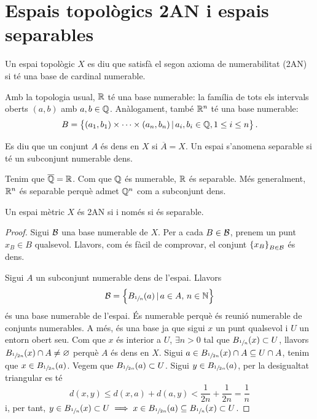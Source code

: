 \section{Espais topològics 2AN i espais separables}

\begin{defi}
	Un espai topològic $X$ es diu que satisfà el segon axioma de numerabilitat (2AN) si té una base de cardinal numerable.
\end{defi}

\begin{example}
	Amb la topologia usual, $\mathbb{R}$ t\'e una base numerable: la fam\'ilia de tots els intervals oberts $(a, b)$ amb $a, b \in \mathbb{Q}$. An\`alogament, també $\mathbb{R}^n$ té una base numerable:
	\[B=\left\{(a_1,b_1)\times\dots\times(a_n,b_n)\,|\,a_i, b_i\in \mathbb{Q}, 1\leq i\leq n\right\}. \]
\end{example}

\begin{defi}
	Es diu que un conjunt $A$ és dens en $X$ si $\overline{A} = X$. Un espai s'anomena separable si té un subconjunt numerable dens.
\end{defi}

\begin{example}
	Tenim que $\overline{\mathbb{Q}} = \mathbb{R}$. Com que $\mathbb{Q}$ és numerable, $\mathbb{R}$ és separable. Més generalment, $\mathbb{R}^n$ és separable perquè admet $\mathbb{Q}^n$ com a subconjunt dens.
\end{example}

\begin{prop}
	Un espai mètric $X$ és 2AN si i només si és separable.
\end{prop}
\begin{proof}
	Sigui $\mathcal{B}$ una base numerable de $X$. Per a cada $B \in \mathcal{B}$, prenem un punt $x_B \in B$ qualsevol. Llavors, com és fàcil de comprovar, el conjunt $\left\{x_B\right\}_{B \in \mathcal{B}}$ és dens.

	\quad

	Sigui $A$ un subconjunt numerable dens de l'espai. Llavors
	\[\mathcal{B} = \left\{B_{\sfrac{1}{n}} (a) \, | \, a\in A, \, n\in \mathbb{N}\right\}\]
	és una base numerable de l'espai. És numerable perquè és reunió numerable de conjunts numerables. A més, és una base ja que sigui $x$ un punt qualsevol i $U$ un entorn obert seu. Com que $x$ és interior a $U$, $\exists n>0$ tal que $B_{\sfrac{1}{n}}(x)\subset U$, llavors $B_{\sfrac{1}{2n}}(x)\cap A \neq \varnothing$ perquè $A$ és dens en $X$. Sigui $a \in B_{\sfrac{1}{2n}}(x)\cap A\subseteq U\cap A$, tenim que $x \in B_{\sfrac{1}{2n}}(a)$. Vegem que $B_{\sfrac{1}{2n}}(a)\subset U$. Sigui $y \in B_{\sfrac{1}{2n}}(a)$, per la desigualtat triangular es té
	\[d(x, y) \leq d(x, a) + d(a, y) < \frac{1}{2n} + \frac{1}{2n} = \frac{1}{n}\]
	i, per tant, $y\in B_{\sfrac{1}{n}}(x) \subset U \implies x \in B_{\sfrac{1}{2n}}(a)\subseteq B_{\sfrac{1}{n}}(x) \subset U$.
\end{proof}


